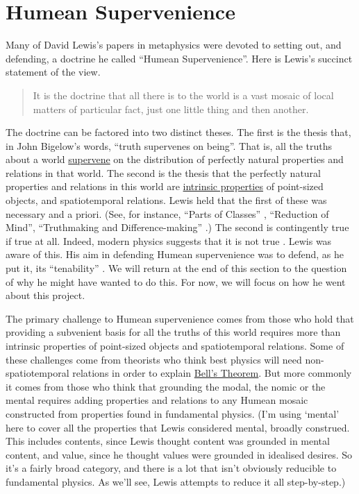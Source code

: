 \section{Humean Supervenience} 
Many of David Lewis's papers in metaphysics were devoted to setting out, and defending, a doctrine he called ``Humean Supervenience''. Here is Lewis's succinct statement of the view.

\begin{quote}It is the doctrine that all there is to the world is a vast mosaic of local matters of particular fact, just one little thing and then another. \citeyearpar[ix]{Lewis1986b}
 \end{quote}

\noindent The doctrine can be factored into two distinct theses. The first is the thesis that, in John Bigelow's words, ``truth supervenes on being''. That is, all the truths about a world \href{http://plato.stanford.edu/supervenience/index.html#4.3}{supervene} on the distribution of perfectly natural properties and relations in that world. The second is the thesis that the perfectly natural properties and relations in this world are \href{http://plato.stanford.edu/intrinsic-extrinsic/}{intrinsic properties} of point-sized objects, and spatiotemporal relations. Lewis held that the first of these was necessary and a priori. (See, for instance, ``Parts of Classes'' \citeyearpar{Lewis1991a}, ``Reduction of Mind'', ``Truthmaking and Difference-making'' \citeyearpar{Lewis2001d}.) The second is contingently true if true at all. Indeed, modern physics suggests that it is not true \citep[Ch. 2]{Maudlin2007}. Lewis was aware of this. His aim in defending Humean supervenience was to defend, as he put it, its ``tenability'' \citeyearpar[xi]{Lewis1986a}. We will return at the end of this section to the question of why he might have wanted to do this. For now, we will focus on how he went about this project.

The primary challenge to Humean supervenience comes from those who hold that providing a subvenient basis for all the truths of this world requires more than intrinsic properties of point-sized objects and spatiotemporal relations. Some of these challenges come from theorists who think best physics will need non-spatiotemporal relations in order to explain \href{http://plato.stanford.edu/bell-theorem/}{Bell's Theorem}. But more commonly it comes from those who think that grounding the modal, the nomic or the mental requires adding properties and relations to any Humean mosaic constructed from properties found in fundamental physics. (I'm using `mental' here to cover all the properties that Lewis considered mental, broadly construed. This includes contents, since Lewis thought content was grounded in mental content, and value, since he thought values were grounded in idealised desires. So it's a fairly broad category, and there is a lot that isn't obviously reducible to fundamental physics. As we'll see, Lewis attempts to reduce it all step-by-step.)

